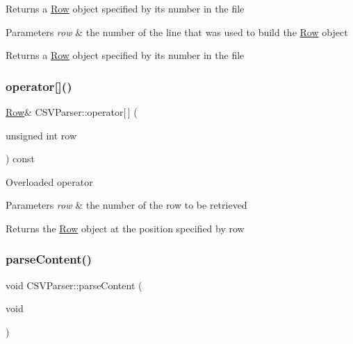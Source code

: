 Returns a \mbox{\hyperlink{class_row}{Row}} object specified by its number in the file 
\begin{DoxyParams}{Parameters}
{\em row} & the number of the line that was used to build the \mbox{\hyperlink{class_row}{Row}} object \\
\hline
\end{DoxyParams}
\begin{DoxyReturn}{Returns}
a \mbox{\hyperlink{class_row}{Row}} object specified by its number in the file 
\end{DoxyReturn}
\mbox{\label{class_c_s_v_parser_a7d3d0c3f994b825aaba25625f0b01612}} 
\subsubsection{\texorpdfstring{operator[]()}{operator[]()}}
{\footnotesize\ttfamily \mbox{\hyperlink{class_row}{Row}}\& C\+S\+V\+Parser\+::operator\mbox{[}$\,$\mbox{]} (\begin{DoxyParamCaption}\item[{unsigned int}]{row }\end{DoxyParamCaption}) const}

Overloaded operator 
\begin{DoxyParams}{Parameters}
{\em row} & the number of the row to be retrieved \\
\hline
\end{DoxyParams}
\begin{DoxyReturn}{Returns}
the \mbox{\hyperlink{class_row}{Row}} object at the position specified by row 
\end{DoxyReturn}
\mbox{\label{class_c_s_v_parser_aa403f7d8238903aa0e046a9a091ab968}} 
\subsubsection{\texorpdfstring{parseContent()}{parseContent()}}
{\footnotesize\ttfamily void C\+S\+V\+Parser\+::parse\+Content (\begin{DoxyParamCaption}\item[{void}]{ }\end{DoxyParamCaption})\hspace{0.3cm}{\ttfamily [protected]}}

